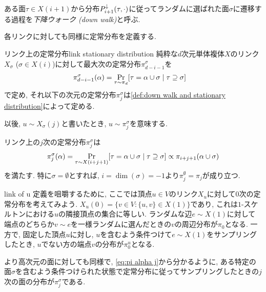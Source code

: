 ある面$\tau\in X(i+1)$から分布$P^{\downarrow}_{i+1}(\tau,\cdot)$に従ってランダムに選ばれた面$\sigma$に遷移する過程を\emph{下降ウォーク (down walk)}と呼ぶ.

各リンクに対しても同様に定常分布を定義する.
\begin{definition}{リンク上の定常分布}{link stationary distribution}
    純粋な$d$次元単体複体$X$のリンク$X_\sigma$ ($\sigma \in X(i)$)に対して最大次の定常分布$\pi^{\sigma}_{d-i-1}$を
    \begin{align*}
        \pi^\sigma_{d-i-1}(\alpha) &= \Pr_{\tau\sim\pi_{d}}\sbra*{\tau=\alpha\cup \sigma \condition \tau\supseteq \sigma}
    \end{align*}
    で定め, それ以下の次元の定常分布$\pi^\sigma_j$は\cref{def:down walk and stationary distribution}によって定める.

    以後, $u\sim X_\sigma(j)$と書いたとき, $u \sim \pi^\sigma_j$を意味する.
\end{definition}
リンク上の$j$次の定常分布$\pi^\sigma_j$は
\begin{align}
    \pi^\sigma_j(\alpha) = \Pr_{\tau \sim X(i+j+1)}\sbra*{\tau = \alpha \cup \sigma \condition \tau \supseteq \sigma} \propto \pi_{i+j+1}(\alpha\cup\sigma) \label{eq:pi alpha j}
\end{align}
を満たす.
特に$\sigma=\emptyset$とすれば, $i=\dim(\sigma)=-1$より$\pi^\emptyset_j = \pi_j$が成り立つ.

\begin{remark}{}{link of u}
    定義を咀嚼するために, ここでは頂点$u\in V$のリンク$X_u$に対して$0$次の定常分布を考えてみよう.
    $X_u(0)=\{v \in V \colon \{u,v\}\in X(1)\}$であり, これは$1$-スケルトンにおける$u$の隣接頂点の集合に等しい.
    ランダムな辺$e \sim X(1)$に対して端点のどちらか$v \sim e$を一様ランダムに選んだときの$v$の周辺分布が$\pi_0$となる.
    一方で, 固定した頂点$u$に対し, $u$を含むよう条件つけて$e \sim X(1)$をサンプリングしたとき, $u$でない方の端点$v$の分布が$\pi^u_0$となる.
    
    より高次元の面に対しても同様で, \cref{eq:pi alpha j}から分かるように, ある特定の面$\sigma$を含むよう条件つけられた状態で定常分布に従ってサンプリングしたときの$j$次の面の分布が$\pi^\sigma_j$である.
\end{remark}

